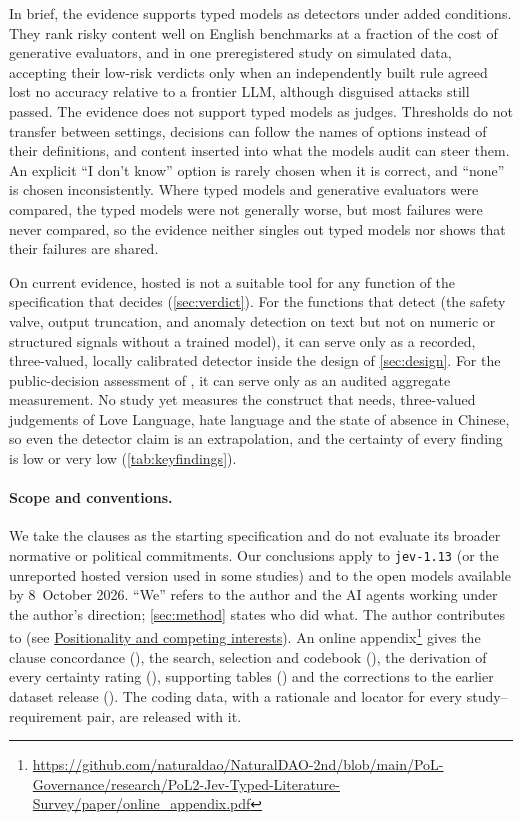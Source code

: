 In brief, the evidence supports typed models as detectors under added conditions.
They rank risky content well on English benchmarks at a fraction of the cost of generative evaluators, and in one preregistered study on simulated data, accepting their low-risk verdicts only when an independently built rule agreed lost no accuracy relative to a frontier LLM, although disguised attacks still passed.
The evidence does not support typed models as judges.
Thresholds do not transfer between settings, decisions can follow the names of options instead of their definitions, and content inserted into what the models audit can steer them.
An explicit ``I don't know'' option is rarely chosen when it is correct, and ``none'' is chosen inconsistently.
Where typed models and generative evaluators were compared, the typed models were not generally worse, but most failures were never compared, so the evidence neither singles out typed models nor shows that their failures are shared.

On current evidence, hosted \jev{} is not a suitable tool for any function of the specification that decides (\cref{sec:verdict}).
For the functions that detect (the safety valve, output truncation, and anomaly detection on text but not on numeric or structured signals without a trained model), it can serve only as a recorded, three-valued, locally calibrated detector inside the design of \cref{sec:design}.
For the public-decision assessment of , it can serve only as an audited aggregate measurement.
No study yet measures the construct that \pol{} needs, three-valued judgements of Love Language, hate language and the state of absence in Chinese, so even the detector claim is an extrapolation, and the certainty of every finding is low or very low (\cref{tab:keyfindings}).

\paragraph{Scope and conventions.}
We take the \pol{} clauses as the starting specification and do not evaluate its broader normative or political commitments.
Our conclusions apply to \texttt{jev-1.13} (or the unreported hosted version used in some studies) and to the open models available by 8~October 2026.
``We'' refers to the author and the AI agents working under the author's direction; \cref{sec:method} states who did what.
The author contributes to \pol{} (see \hyperref[sec:statements]{Positionality and competing interests}).
An online appendix\footnote{\url{https://github.com/naturaldao/NaturalDAO-2nd/blob/main/PoL-Governance/research/PoL2-Jev-Typed-Literature-Survey/paper/online_appendix.pdf}} gives the clause concordance (), the search, selection and codebook (), the derivation of every certainty rating (), supporting tables () and the corrections to the earlier dataset release ().
The coding data, with a rationale and locator for every study--requirement pair, are released with it.

